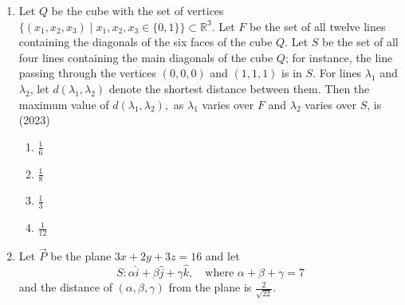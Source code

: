 \begin{enumerate}[label=\thesubsection.\arabic*.,ref=\thesubsection.\theenumi]
$$\myvec{
0 &-c_3& c_2\\
c_3&0&-c_1\\
-c_2&c_1&0 
}
\myvec{
1 \\
b_2 \\
b_3}
    =
\myvec{
3 - c_1\\
1 - c_2 \\
-1 - c_3}
$$
Then, which of the following statements is/are TRUE?
\hfill (2022)  
\begin{multicols}{4}     \begin{enumerate}
	\item $\vec{\overrightarrow{a}} \cdot \vec{\overrightarrow{c}}$ = 0
 	    \item $\vec{\overrightarrow{b}} \cdot \vec{\overrightarrow{c}}$ = 0
 	    \item $|\vec{\overrightarrow{b}}| > \sqrt{10}$
 	    \item $|\vec{\overrightarrow{c}}| \leq \sqrt{11}$
\end{enumerate} \end{multicols}
  \item Let $Q$ be the cube with the set of vertices $ \{(x_1, x_2, x_3) \mid x_1, x_2, x_3 \in \{0,1\} \} \subset \mathbb{R}^3$. Let $F$ be the set of all twelve lines containing the diagonals of the six faces of the cube $Q$. Let $S$ be the set of all four lines containing the main diagonals of the cube $Q$; for instance, the line passing through the vertices $(0,0,0)$ and $(1,1,1)$ is in $S$. For lines $\lambda_1$ and $\lambda_2$, let $ d(\lambda_1, \lambda_2) $ denote the shortest distance between them. Then the maximum value of $ d(\lambda_1, \lambda_2), $ as $\lambda_1$ varies over $F$ and $\lambda_2$ varies over $S$, is 
\hfill (2023)    
\begin{multicols}{4}     
\begin{enumerate}
 \item $\frac{1}{6}$
 \item $\frac{1}{8}$
 \item $\frac{1}{3}$
 \item $\frac{1}{12}$
\end{enumerate}
\end{multicols}
%
\solution 

 \item Let $\vec{P}$ be the plane $3x + 2y + 3z = 16$ and let 
$$
S : \alpha \hat{i} + \beta \hat{j} + \gamma \hat{k}, \quad \text{where } \alpha + \beta + \gamma = 7
$$
and the distance of $(\alpha, \beta, \gamma)$ from the plane is $\frac{2}{\sqrt{22}}$.

\end{enumerate}

